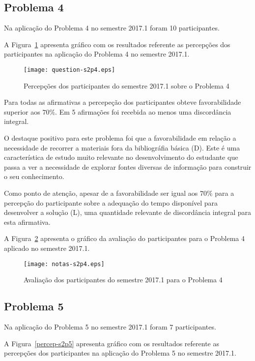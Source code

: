 \subsection{Problema 4}
Na aplicação do Problema 4 no semestre 2017.1 foram 10 participantes.

A Figura~\ref{percep-s2p4} apresenta gráfico com os resultados referente
as percepções dos participantes na aplicação do
Problema 4 no semestre 2017.1.

\begin{figure}[!htb]
\centering
\texttt{[image: question-s2p4.eps]}
\caption{Percepções dos participantes do semestre 2017.1 sobre o Problema 4}
\label{percep-s2p4}
\end{figure}

Para todas as afirmativas a percepeção dos participantes obteve favorabilidade
superior aos $70\%$. Em 5 afirmações foi recebida ao menos uma discordância
integral.

O destaque positivo para este problema foi que a favorabilidade em relação
a necessidade de recorrer a materiais fora da bibliográfia básica (D).
Este é uma característica de estudo muito relevante no desenvolvimento
do estudante que passa a ver a necessidade de explorar fontes diversas
de informação para construir o seu conhecimento.

Como ponto de atenção, apesar de a favorabilidade ser igual aos $70\%$ para
a percepção do participante sobre a adequação do tempo disponível para desenvolver
a solução (L), uma quantidade relevante de discordância integral para esta afirmativa.

A Figura~\ref{aval-s2p4} apresenta o gráfico da
avaliação do participantes para o Problema 4 aplicado no semestre 2017.1.

\begin{figure}[!htb]
\centering
\texttt{[image: notas-s2p4.eps]}
\caption{Avaliação dos participantes do semestre 2017.1 para o Problema 4}
\label{aval-s2p4}
\end{figure}

\subsection{Problema 5}
Na aplicação do Problema 5 no semestre 2017.1 foram 7 participantes.

A Figura~\ref{percep-s2p5} apresenta gráfico com os resultados referente
as percepções dos participantes na aplicação do
Problema 5 no semestre 2017.1.

